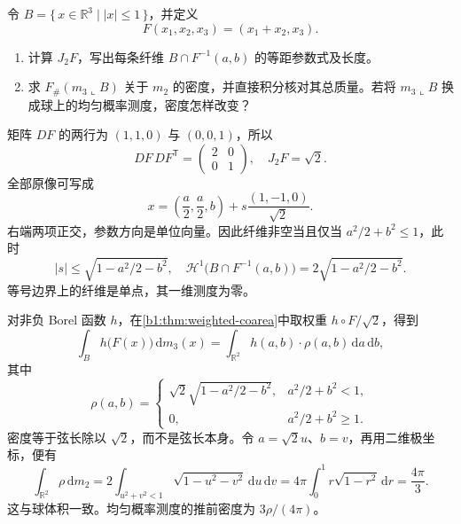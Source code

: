 \begin{exercise}\label{b1:ex:18-oblique-ball-fibers}
令 \(B=\{\,x\in\mathbb R^3\mid |x|\le1\,\}\)，并定义
\[
 F(x_1,x_2,x_3)=(x_1+x_2,x_3).
\]
\begin{enumerate}
\item\label{b1:item:18-oblique-fiber-length}
计算 \(J_2F\)，写出每条纤维 \(B\cap F^{-1}(a,b)\) 的等距参数式及长度。
\item\label{b1:item:18-oblique-pushforward}
求 \(F_\#(m_3\llcorner B)\) 关于 \(m_2\) 的密度，并直接积分核对其总质量。若将 \(m_3\llcorner B\) 换成球上的均匀概率测度，密度怎样改变？
\end{enumerate}
\end{exercise}
\begin{solution}
矩阵 \(DF\) 的两行为 \((1,1,0)\) 与 \((0,0,1)\)，所以
\[
 DF\,DF^{\mathsf T}=\begin{pmatrix}2&0\\0&1\end{pmatrix},
 \quad J_2F=\sqrt2.
\]
全部原像可写成
\[
 x=\left(\frac a2,\frac a2,b\right)
 +s\frac{(1,-1,0)}{\sqrt2}.
\]
右端两项正交，参数方向是单位向量。因此纤维非空当且仅当 \(a^2/2+b^2\le1\)，此时
\[
 |s|\le\sqrt{1-a^2/2-b^2},
 \quad
 \mathcal H^1\bigl(B\cap F^{-1}(a,b)\bigr)
 =2\sqrt{1-a^2/2-b^2}.
\]
等号边界上的纤维是单点，其一维测度为零。

对非负 Borel 函数 \(h\)，在\cref{b1:thm:weighted-coarea}中取权重 \(h\circ F/\sqrt2\)，得到
\[
 \int_Bh\bigl(F(x)\bigr)\,\mathrm dm_3(x)
 =\int_{\mathbb R^2}h(a,b)\cdot\rho(a,b)\,\mathrm da\,\mathrm db,
\]
其中
\[
 \rho(a,b)=
 \begin{cases}
 \sqrt2\sqrt{1-a^2/2-b^2},&a^2/2+b^2<1,\\
 0,&a^2/2+b^2\ge1.
 \end{cases}
\]
密度等于弦长除以 \(\sqrt2\)，而不是弦长本身。令 \(a=\sqrt2 u\)、\(b=v\)，再用二维极坐标，便有
\[
 \int_{\mathbb R^2}\rho\,\mathrm dm_2
 =2\int_{u^2+v^2<1}\sqrt{1-u^2-v^2}\,\mathrm du\,\mathrm dv
 =4\pi\int_0^1r\sqrt{1-r^2}\,\mathrm dr
 =\frac{4\pi}{3}.
\]
这与球体积一致。均匀概率测度的推前密度为 \(3\rho/(4\pi)\)。
\end{solution}

